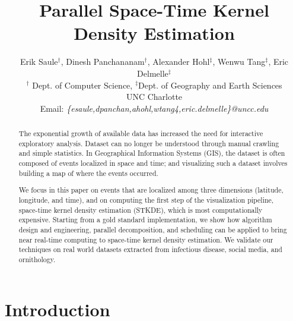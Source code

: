 \documentclass{article}
\begin{document}
\title{Parallel Space-Time Kernel Density Estimation}


\author{Erik  Saule$^\dag$, Dinesh Panchananam$^\dag$, Alexander Hohl$^\ddag$, Wenwu Tang$^\ddag$, Eric Delmelle$^\ddag$\\
  $^\dag$ Dept. of Computer Science, $^\ddag$Dept. of Geography and Earth Sciences\\
UNC Charlotte\\
Email: {\it \{esaule,dpanchan,ahohl,wtang4,eric.delmelle\}@uncc.edu}
}

\maketitle


\begin{abstract}
  The exponential growth of available data has
  increased the need for interactive exploratory analysis. Dataset
  can no longer be understood through  manual crawling  and
 simple statistics. In Geographical Information Systems
  (GIS), the dataset is often composed of events localized in space
  and time; and visualizing such a dataset involves building a map of
  where the events occurred.

  We focus in this paper on events that are localized among three
  dimensions (latitude, longitude, and time), and on computing the
  first step of the visualization pipeline, space-time kernel density
  estimation (STKDE), which is most computationally expensive.  Starting from
  a gold standard implementation, we show how algorithm design and
  engineering, parallel decomposition, and scheduling can be applied
  to bring near real-time computing to space-time kernel density
  estimation. We validate our techniques on real world datasets
  extracted from infectious disease, social media, and ornithology.
\end{abstract}


\maketitle

\section{Introduction}
\end{document}
